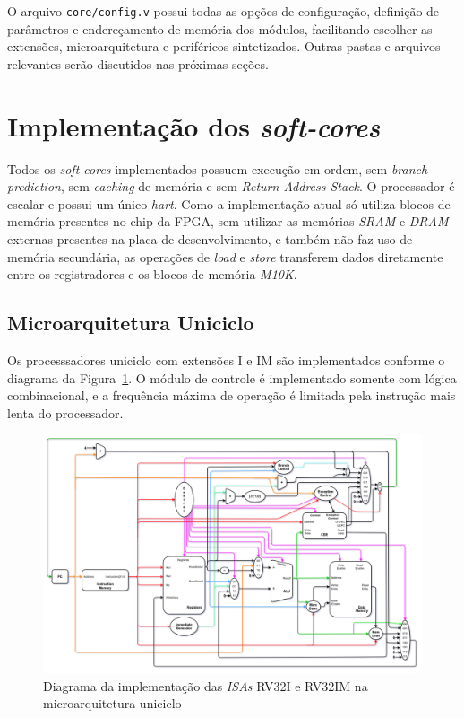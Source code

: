     {
        O arquivo \texttt{core/config.v} possui todas as opções de configuração,
        definição de parâmetros e endereçamento de memória dos módulos, facilitando
        escolher as extensões, microarquitetura e periféricos sintetizados. Outras
        pastas e arquivos relevantes serão discutidos nas próximas seções.
    }


\section{Implementação dos \textit{soft-cores}}
    { Todos os \textit{soft-cores} implementados possuem execução em ordem, sem
        \textit{branch prediction}, sem \textit{caching} de memória e sem
        \textit{Return Address Stack}. O processador é escalar e possui um
        único \textit{hart}. Como a implementação atual só utiliza blocos de
        memória presentes no chip da FPGA, sem utilizar as memórias
        \textit{SRAM} e \textit{DRAM} externas presentes na placa de
        desenvolvimento, e também não faz uso de memória secundária, as operações
        de \textit{load} e \textit{store} transferem dados diretamente entre os
        registradores e os blocos de memória \textit{M10K}.
    }

    \subsection{Microarquitetura Uniciclo}

        { Os processsadores uniciclo com extensões I e IM são implementados
            conforme o diagrama da Figura~\ref{fig:diagram_rv32i_uni}. O módulo
            de controle é implementado somente com lógica combinacional, e a
            frequência máxima de operação é limitada pela instrução mais lenta
            do processador.
        }

        \begin{figure}[H]
        \centering
            \includegraphics[width=.9\linewidth]{../images/uarch_diagrams/singlecycle-RV32I-RV32IM.png}
            \caption{Diagrama da implementação das \textit{ISAs} RV32I e RV32IM na
            microarquitetura uniciclo}\label{fig:diagram_rv32i_uni}
        \end{figure}

